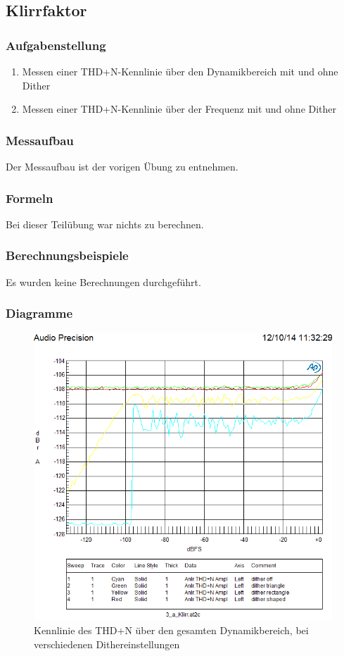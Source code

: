 \subsection{Klirrfaktor}
\subsubsection{Aufgabenstellung}
\begin{enumerate}
\item Messen einer THD+N-Kennlinie über den Dynamikbereich mit und ohne Dither
\item Messen einer THD+N-Kennlinie über der Frequenz mit und ohne Dither
\end{enumerate}

\subsubsection{Messaufbau}
Der Messaufbau ist der vorigen Übung zu entnehmen.
\subsubsection{Formeln}
Bei dieser Teilübung war nichts zu berechnen.
\subsubsection{Berechnungsbeispiele}
Es wurden keine Berechnungen durchgeführt.

\subsubsection{Diagramme}
\begin{figure}[h!]
\centering
\includegraphics[width=\columnwidth]{figures/Aufg2/3a5.PNG} 
\caption{Kennlinie des THD+N über den gesamten Dynamikbereich, bei verschiedenen Dithereinstellungen}
\label{fig:100}
\end{figure}


